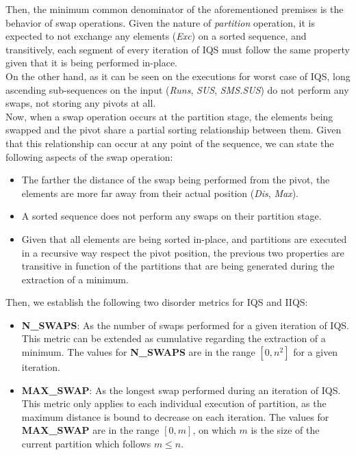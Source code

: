 Then, the minimum common denominator of the aforementioned premises is the behavior of swap operations. Given the nature of \textit{partition} operation, it is expected to not exchange any elements (\textit{Exc}) on a sorted sequence, and transitively, each segment of every iteration of IQS must follow the same property given that it is being performed in-place.\\

On the other hand, as it can be seen on the executions for worst case of IQS, long ascending sub-sequences on the input (\textit{Runs}, \textit{SUS}, \textit{SMS.SUS}) do not perform any swaps, not storing any pivots at all.\\

Now, when a swap operation occurs at the partition stage, the elements being swapped and the pivot share a partial sorting relationship between them. Given that this relationship can occur at any point of the sequence, we can state the following aspects of the swap operation:\\

\begin{itemize}
    \item The farther the distance of the swap being performed from the pivot, the elements are more far away from their actual position (\textit{Dis}, \textit{Max}).
    \item A sorted sequence does not perform any swaps on their partition stage.
    \item Given that all elements are being sorted in-place, and partitions are executed in a recursive way respect the pivot position, the previous two properties are transitive in function of the partitions that are being generated during the extraction of a minimum.
\end{itemize}

Then, we establish the following two disorder metrics for IQS and IIQS:\\

\begin{itemize}
    \item \textbf{N\_SWAPS}: As the number of swaps performed for a given iteration of IQS. This metric can be extended as cumulative regarding the extraction of a minimum. The values for \textbf{N\_SWAPS} are in the range $[0, n^2]$ for a given iteration.
    \item \textbf{MAX\_SWAP}: As the longest swap performed during an iteration of IQS. This metric only applies to each individual execution of partition, as the maximum distance is bound to decrease on each iteration. The values for \textbf{MAX\_SWAP} are in the range $[0, m]$, on which $m$ is the size of the current partition which follows $m \leq n$.
\end{itemize}

